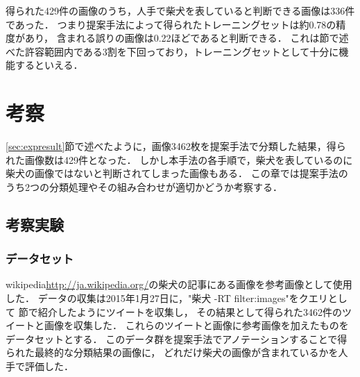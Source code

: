 得られた429件の画像のうち，人手で柴犬を表していると判断できる画像は336件であった．
つまり提案手法によって得られたトレーニングセットは約0.78の精度があり，
含まれる誤りの画像は0.22ほどであると判断できる．
これは\label{sec:related}節で述べた許容範囲内である3割を下回っており，トレーニングセットとして十分に機能するといえる．


%

\chapter{考察}
\label{sec:examination}

\ref{sec:expresult}節で述べたように，画像3462枚を提案手法で分類した結果，得られた画像数は429件となった．
しかし本手法の各手順で，柴犬を表しているのに柴犬の画像ではないと判断されてしまった画像もある．
この章では提案手法のうち2つの分類処理やその組み合わせが適切かどうか考察する．

\section{考察実験}
\subsection{データセット}
wikipedia\url{http://ja.wikipedia.org/}の柴犬の記事にある画像を参考画像として使用した．
データの収集は2015年1月27日に，"柴犬 -RT filter:images"をクエリとして
\label{sec:tweetCollect}節で紹介したようにツイートを収集し，
その結果として得られた3462件のツイートと画像を収集した．
これらのツイートと画像に参考画像を加えたものをデータセットとする．
このデータ群を提案手法でアノテーションすることで得られた最終的な分類結果の画像に，
どれだけ柴犬の画像が含まれているかを人手で評価した．

